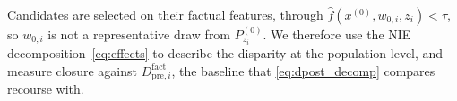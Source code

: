 Candidates are selected on their factual features, through
$\hat f(x^{(0)},w_{0,i},z_i)<\tau$, so $w_{0,i}$ is not a representative draw
from $P_{z_i}^{(0)}$. We therefore use the NIE decomposition~\eqref{eq:effects}
to describe the disparity at the population level, and measure closure
against $D^{\mathrm{fact}}_{\mathrm{pre},i}$, the baseline that
\eqref{eq:dpost_decomp} compares recourse with.
